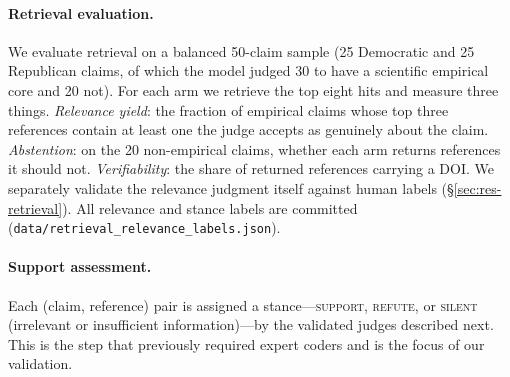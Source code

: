 \paragraph{Retrieval evaluation.} We evaluate retrieval on a balanced 50-claim sample (25 Democratic and
25 Republican claims, of which the model judged 30 to have a scientific empirical core and 20 not). For
each arm we retrieve the top eight hits and measure three things. \emph{Relevance yield}: the fraction of
empirical claims whose top three references contain at least one the judge accepts as genuinely about the
claim. \emph{Abstention}: on the 20 non-empirical claims, whether each arm returns references it should
not. \emph{Verifiability}: the share of returned references carrying a DOI. We separately validate the
relevance judgment itself against human labels (\S\ref{sec:res-retrieval}). All relevance and stance
labels are committed (\texttt{data/retrieval\_relevance\_labels.json}).

\paragraph{Support assessment.} Each (claim, reference) pair is assigned a stance---\textsc{support},
\textsc{refute}, or \textsc{silent} (irrelevant or insufficient information)---by the validated judges
described next. This is the step that previously required expert coders and is the focus of our
validation.

